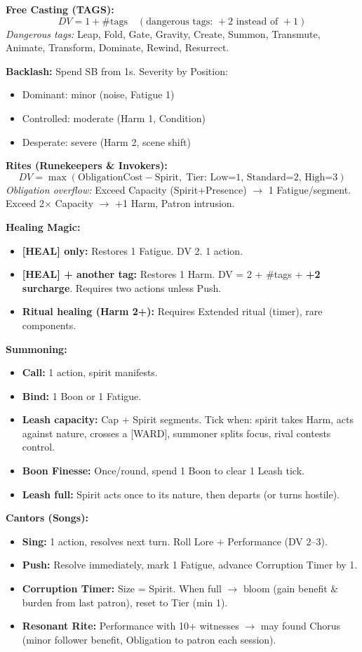 \textbf{Free Casting (TAGS):}
\[
DV = 1 + \text{\#tags} \quad(\text{dangerous tags: } +2\text{ instead of }+1)
\]
\emph{Dangerous tags:} Leap, Fold, Gate, Gravity, Create, Summon, Transmute, Animate, Transform, Dominate, Rewind, Resurrect.

\textbf{Backlash:} Spend SB from 1s. Severity by Position:
\begin{itemize}
  \item Dominant: minor (noise, Fatigue 1)
  \item Controlled: moderate (Harm 1, Condition)
  \item Desperate: severe (Harm 2, scene shift)
\end{itemize}

\textbf{Rites (Runekeepers \& Invokers):}
\[
DV = \max(\text{ObligationCost} - \text{Spirit},\; \text{Tier: Low=1, Standard=2, High=3})
\]
\emph{Obligation overflow:} Exceed Capacity (Spirit+Presence) $\rightarrow$ 1 Fatigue/segment. Exceed 2$\times$ Capacity $\rightarrow$ +1 Harm, Patron intrusion.

\textbf{Healing Magic:}
\begin{itemize}
  \item \textbf{[HEAL] only:} Restores 1 Fatigue. DV 2. 1 action.
  \item \textbf{[HEAL] + another tag:} Restores 1 Harm. DV = 2 + \#tags + \textbf{+2 surcharge}. Requires two actions unless Push.
  \item \textbf{Ritual healing (Harm 2+):} Requires Extended ritual (timer), rare components.
\end{itemize}

\textbf{Summoning:}
\begin{itemize}
  \item \textbf{Call:} 1 action, spirit manifests.
  \item \textbf{Bind:} 1 Boon or 1 Fatigue.
  \item \textbf{Leash capacity:} Cap + Spirit segments. Tick when: spirit takes Harm, acts against nature, crosses a [WARD], summoner splits focus, rival contests control.
  \item \textbf{Boon Finesse:} Once/round, spend 1 Boon to clear 1 Leash tick.
  \item \textbf{Leash full:} Spirit acts once to its nature, then departs (or turns hostile).
\end{itemize}

\textbf{Cantors (Songs):}
\begin{itemize}
  \item \textbf{Sing:} 1 action, resolves next turn. Roll Lore + Performance (DV 2--3).
  \item \textbf{Push:} Resolve immediately, mark 1 Fatigue, advance Corruption Timer by 1.
  \item \textbf{Corruption Timer:} Size = Spirit. When full $\rightarrow$ bloom (gain benefit \& burden from last patron), reset to Tier (min 1).
  \item \textbf{Resonant Rite:} Performance with 10+ witnesses $\rightarrow$ may found Chorus (minor follower benefit, Obligation to patron each session).
\end{itemize}

